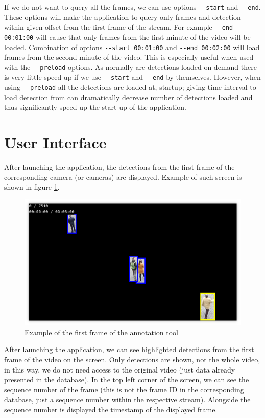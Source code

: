 If we do not want to query all the frames, we can use options \verb+--start+ and
\verb+--end+. These options will make the application to query only frames and detection
within given offset from the first frame of the stream. For example \verb+--end 00:01:00+
will cause that only frames from the first minute of the video will be loaded.
Combination of options \verb+--start 00:01:00+ and \verb+--end 00:02:00+ will load
frames from the second minute of the video. This is especially useful when used with
the \verb+--preload+ options. As normally are detections loaded on-demand there is very
little speed-up if we use \verb+--start+ and \verb+--end+ by themselves. However, when
using \verb+--preload+ all the detections are loaded at, startup; giving time interval
to load detection from can dramatically decrease number of detections loaded and thus
significantly speed-up the start up of the application.

\section{User Interface}

After launching the application, the detections from the first frame of the corresponding
camera (or cameras) are displayed. Example of such screen is shown in figure
\ref{fig:annotation_tool_screenshot}.

\begin{figure}
    \centering
    \includegraphics[width=\textwidth]{../img/annotation_tool_screenshot.png}
    \caption{Example of the first frame of the annotation tool}
    \label{fig:annotation_tool_screenshot}
\end{figure}

After launching the application, we can see highlighted detections from
the first frame of the video on the screen.
Only detections are shown, not the whole video, in this way, we do not need access
to the original video (just data already presented in the database). In the top left corner
of the screen, we can see the sequence number of the frame (this is not the frame ID
in the corresponding database, just a sequence number within the respective stream). Alongside
the sequence number is displayed the timestamp of the displayed frame.

